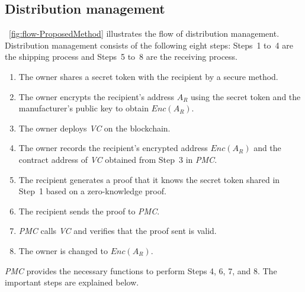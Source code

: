 \documentclass[conference]{IEEEtran}
\begin{document}
\subsection{Distribution management}
\figurename~\ref{fig:flow-ProposedMethod} illustrates the flow of distribution management.
Distribution management consists of the following eight steps: Steps~1 to~4 are the shipping process and Steps~5 to~8 are the receiving process.
\begin{enumerate}
    \item The owner shares a secret token with the recipient by a secure method.
    \item The owner encrypts the recipient's address $A_R$ using the secret token and the manufacturer's public key to obtain $\textit{Enc}(A_R)$.
    \item The owner deploys \textit{VC} on the blockchain.
    \item The owner records the recipient's encrypted address $\textit{Enc}(A_R)$ and the contract address of \textit{VC} obtained from Step~3 in \textit{PMC}.
    \item The recipient generates a proof that it knows the secret token shared in Step~1 based on a zero-knowledge proof.
    \item The recipient sends the proof to \textit{PMC}.
    \item \textit{PMC} calls \textit{VC} and verifies that the proof sent is valid.
    \item The owner is changed to $\textit{Enc}(A_R)$.
\end{enumerate}
\textit{PMC} provides the necessary functions to perform Steps 4, 6, 7, and 8.
The important steps are explained below.
\end{document}
